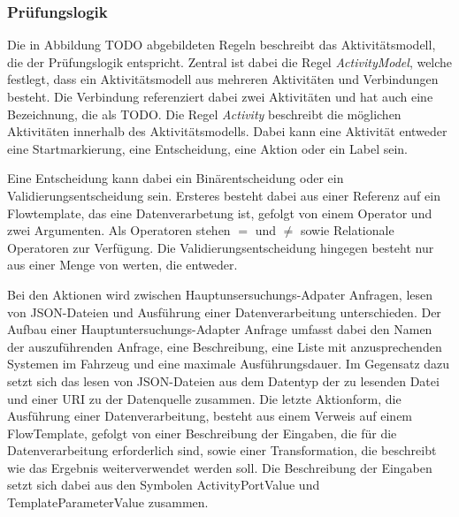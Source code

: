\documentclass{article}
\begin{document}
    \subsubsection{Prüfungslogik}
    Die in Abbildung TODO abgebildeten Regeln beschreibt das Aktivitätsmodell, die der Prüfungslogik entspricht. \cite{99}
    Zentral ist dabei die Regel \textit{ActivityModel}, welche festlegt, dass ein Aktivitätsmodell aus mehreren Aktivitäten und Verbindungen besteht.
    Die Verbindung referenziert dabei zwei Aktivitäten und hat auch eine Bezeichnung, die als TODO.
    Die Regel \textit{Activity} beschreibt die möglichen Aktivitäten innerhalb des Aktivitätsmodells. 
    Dabei kann eine Aktivität entweder eine Startmarkierung, eine Entscheidung, eine Aktion oder ein Label sein.
    
    Eine Entscheidung kann dabei ein Binärentscheidung oder ein Validierungsentscheidung sein.
    Ersteres besteht dabei aus einer Referenz auf ein Flowtemplate, das eine Datenverarbetung ist, gefolgt von einem Operator und zwei Argumenten. 
    Als Operatoren stehen $=$ und $\neq$ sowie Relationale Operatoren zur Verfügung.
    Die Validierungsentscheidung hingegen besteht nur aus einer Menge von werten, die entweder.

    Bei den Aktionen wird zwischen Hauptunsersuchungs-Adpater Anfragen, lesen von JSON-Dateien und Ausführung einer Datenverarbeitung unterschieden.
    Der Aufbau einer Hauptuntersuchungs-Adapter Anfrage umfasst dabei den Namen der auszuführenden Anfrage, eine Beschreibung, eine Liste mit anzusprechenden Systemen im Fahrzeug und eine maximale Ausführungsdauer.
    Im Gegensatz dazu setzt sich das lesen von JSON-Dateien aus dem Datentyp der zu lesenden Datei und einer URI zu der Datenquelle zusammen.
    Die letzte Aktionform, die Ausführung einer Datenverarbeitung, besteht aus einem Verweis auf einem FlowTemplate, gefolgt von einer Beschreibung der Eingaben, die für die Datenverarbeitung erforderlich sind, sowie einer Transformation, die beschreibt wie das Ergebnis weiterverwendet werden soll.    
    Die Beschreibung der Eingaben setzt sich dabei aus den Symbolen ActivityPortValue und TemplateParameterValue zusammen.
\end{document}
